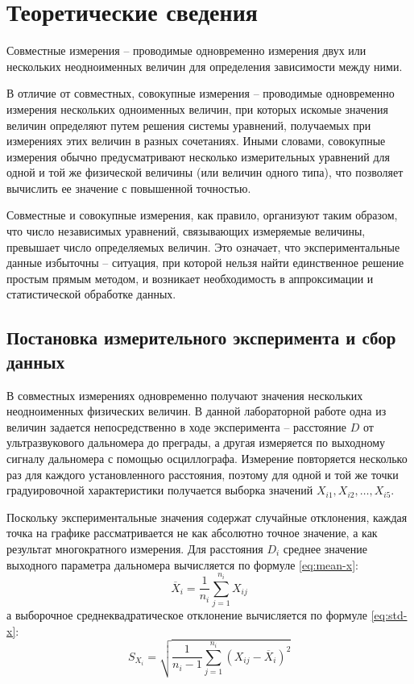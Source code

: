 \documentclass[12pt,a4paper]{article}
\begin{document}
\normalsize
{}
\section{Теоретические сведения}

Совместные измерения – проводимые одновременно измерения
двух или нескольких неодноименных величин для определения зависимости между ними.

В отличие от совместных, совокупные измерения – проводимые одновременно измерения
нескольких одноименных величин, при которых
искомые значения величин определяют путем решения системы уравнений, получаемых при
измерениях этих величин в разных сочетаниях.
Иными словами, совокупные измерения обычно предусматривают
несколько измерительных уравнений для одной и той же физической
величины (или величин одного типа), что позволяет вычислить ее значение с повышенной
точностью.

Совместные и совокупные измерения, как правило, организуют таким образом,
что число независимых уравнений, связывающих измеряемые величины,
превышает число определяемых величин. Это означает,
что экспериментальные данные избыточны – ситуация, при которой
нельзя найти единственное решение простым прямым методом, и возникает
необходимость в аппроксимации и статистической обработке
данных.

\subsection{Постановка измерительного эксперимента и сбор данных}

В совместных измерениях одновременно получают значения нескольких
неодноименных физических величин. В данной лабораторной работе одна
из величин задается непосредственно в ходе эксперимента – расстояние
$D$ от ультразвукового дальномера до преграды, а другая измеряется
по выходному сигналу дальномера с помощью осциллографа. Измерение
повторяется несколько раз для каждого установленного расстояния, поэтому
для одной и той же точки градуировочной характеристики получается выборка
значений $X_{i1}, X_{i2}, \ldots, X_{i5}$.

Поскольку экспериментальные значения содержат случайные отклонения,
каждая точка на графике рассматривается не как абсолютно точное значение,
а как результат многократного измерения. Для расстояния $D_i$ среднее
значение выходного параметра дальномера вычисляется по формуле \eqref{eq:mean-x}:
\begin{equation}
\overline{X}_i = \frac{1}{n_i}\sum\limits_{j = 1}^{n_i} X_{ij}
\tag{1.1}
\label{eq:mean-x}
\end{equation}
а выборочное среднеквадратическое отклонение вычисляется по формуле \eqref{eq:std-x}:
\begin{equation}
S_{X_i} = \sqrt{\frac{1}{n_i - 1}\sum\limits_{j = 1}^{n_i}\left(X_{ij} - \overline{X}_i\right)^2}
\tag{1.2}
\label{eq:std-x}
\end{equation}
\end{document}
